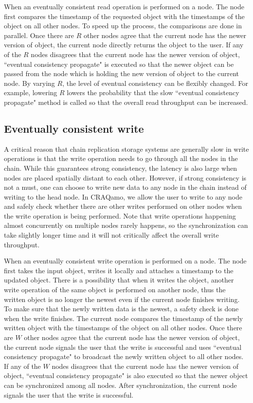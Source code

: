 When an eventually consistent read operation is performed on a node. The node first compares the timestamp of the requested object with the timestamps of the object on all other nodes. To speed up the process, the comparisons are done in parallel. Once there are $R$ other nodes agree that the current node has the newer version of object, the current node directly returns the object to the user. If any of the $R$ nodes disagrees that the current node has the newer version of object, ``eventual consistency propagate" is executed so that the newer object can be passed from the node which is holding the new version of object to the current node. By varying $R$, the level of eventual consistency can be flexibly changed. For example, lowering $R$ lowers the probability that the slow ``eventual consistency propagate" method is called so that the overall read throughput can be increased.

\subsection{Eventually consistent write}
A critical reason that chain replication storage systems are generally slow in write operations is that the write operation needs to go through all the nodes in the chain. While this guarantees strong consistency, the latency is also large when nodes are placed spatially distant to each other. However, if strong consistency is not a must, one can choose to write new data to any node in the chain instead of writing to the head node. In CRAQamo, we allow the user to write to any node and safely check whether there are other writes performed on other nodes when the write operation is being performed. Note that write operations happening almost concurrently on multiple nodes rarely happens, so the synchronization can take slightly longer time and it will not critically affect the overall write throughput.

When an eventually consistent write operation is performed on a node. The node first takes the input object, writes it locally and attaches a timestamp to the updated object. There is a possibility that when it writes the object, another write operation of the same object is performed on another node, thus the written object is no longer the newest even if the current node finishes writing. To make sure that the newly written data is the newest, a safety check is done when the write finishes. The current node compares the timestamp of the newly written object with the timestamps of the object on all other nodes. Once there are $W$ other nodes agree that the current node has the newer version of object, the current node signals the user that the write is successful and uses ``eventual consistency propagate" to broadcast the newly written object to all other nodes. If any of the $W$ nodes disagrees that the current node has the newer version of object, ``eventual consistency propagate" is also executed so that the newer object can be synchronized among all nodes. After synchronization, the current node signals the user that the write is successful. 


